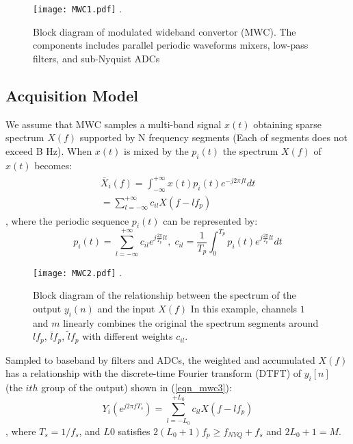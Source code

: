 \begin{figure}[!t]
\centering
\texttt{[image: MWC1.pdf]}
\DeclareGraphicsExtensions.
\caption{Block diagram of modulated wideband convertor (MWC). The components includes parallel periodic waveforms mixers, low-pass filters, and sub-Nyquist ADCs}\label{MWC1}
\end{figure}

\subsection{Acquisition Model}

We assume that MWC samples a multi-band signal $x(t)$ obtaining sparse spectrum $X(f)$ supported by N frequency segments (Each of segments does not exceed B Hz). When $x(t)$ is mixed by the $p_i(t)$
the spectrum $X(f)$ of $x(t)$ becomes: 
\begin{equation}
\label{eqn_mwc1}
\begin{split}
\begin{aligned}
\bar X_i(f) = \int_{-\infty}^{+\infty} x(t) p_i(t) e^{-j2\pi ft}dt \\
= \sum_{l=-\infty}^{+\infty} c_{il} X(f-lf_p)
\end{aligned}
\end{split}
\end{equation}
, where the periodic sequence $p_i(t)$ can be represented by:
\begin{equation}
\label{eqn_mwc2}
p_i(t)=\sum_{l=-\infty}^{+\infty}c_{il}e^{j\frac{2\pi}{T_p}lt},\; c_{il}= \frac{1}{T_p}\int_{0}^{T_p}p_i(t)e^{j\frac{2\pi}{T_p} lt} dt
\end{equation}
\begin{figure}[!t]
\centering
\texttt{[image: MWC2.pdf]}
\DeclareGraphicsExtensions.
\caption{
Block diagram of the relationship between the spectrum of the output $y_i(n)$ and the input $X(f)$ In this example, channels $1$ and $m$ linearly combines the original the spectrum segments around $lf_p$, $\bar lf_p$, $\tilde lf_p$ with different weights $c_{il}$.
}\label{MWC2}
\end{figure}

Sampled to baseband by filters and ADCs, the weighted and accumulated $X(f)$ has a relationship with the discrete-time Fourier transform (DTFT) of $y_i[n]$ (the $ith$ group of the output) shown in (\ref{eqn_mwc3}):
\begin{equation}
\label{eqn_mwc3}
Y_i(e^{j2\pi fT_s})=\sum_{l=-L_0}^{+L_0}c_{il}X(f-lf_p)
\end{equation}
, where $T_s = 1/{f_s}$, and $L0$ satisfies $2(L_0+1)f_p \geq f_{NYQ}+f_s$ and $2L_0+1=M$.

